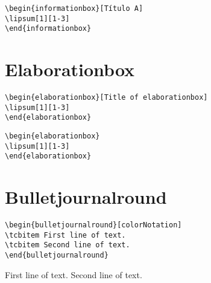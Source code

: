\lipsum[1][1-3]

\begin{verbatim}
\begin{informationbox}[Título A]
\lipsum[1][1-3]
\end{informationbox}
\end{verbatim}
\begin{informationbox}[Título A]
\lipsum[1][1-3]
\end{informationbox}


\section{Elaborationbox}

\lipsum[1][1-3]

\begin{verbatim}
\begin{elaborationbox}[Title of elaborationbox]
\lipsum[1][1-3]
\end{elaborationbox}
\end{verbatim}
\begin{elaborationbox}
\lipsum[1][1-3]
\end{elaborationbox}

\lipsum[1][1-3]
\begin{verbatim}
\begin{elaborationbox}
\lipsum[1][1-3]
\end{elaborationbox}
\end{verbatim}
\begin{elaborationbox}
\lipsum[1][1-3]
\end{elaborationbox}

\section{Bulletjournalround}

\begin{verbatim}
\begin{bulletjournalround}[colorNotation]
\tcbitem First line of text.
\tcbitem Second line of text.
\end{bulletjournalround}
\end{verbatim}
\begin{bulletjournalround}[colorNotation]
\tcbitem First line of text.
\tcbitem Second line of text.
\end{bulletjournalround}

